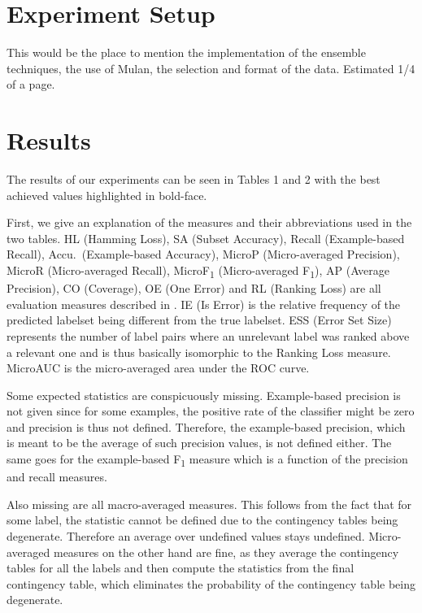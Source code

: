 \section{Experiment Setup}
This would be the place to mention the implementation of the ensemble
techniques, the use of Mulan, the selection and format of the data. Estimated
1/4 of a page.

\section{Results}




The results of our experiments can be seen in Tables 1 and 2 with the
best achieved values highlighted in bold-face.

First, we give an explanation of the measures and their abbreviations
used in the two tables. HL (Hamming Loss), SA (Subset Accuracy),
Recall (Example-based Recall), Accu.\ (Example-based Accuracy), MicroP
(Micro-averaged Precision), MicroR (Micro-averaged Recall),
MicroF\textsubscript{1} (Micro-averaged F\textsubscript{1}), AP
(Average Precision), CO (Coverage), OE (One Error) and RL (Ranking
Loss) are all evaluation measures described in \cite{MLLSlides}. IE
(Is Error) is the relative frequency of the predicted labelset being
different from the true labelset. ESS (Error Set Size) represents the
number of label pairs where an unrelevant label was ranked above a
relevant one and is thus basically isomorphic to the Ranking Loss
measure. MicroAUC is the micro-averaged area under the ROC curve.

Some expected statistics are conspicuously missing. Example-based
precision is not given since for some examples, the positive rate of
the classifier might be zero and precision is thus not
defined. Therefore, the example-based precision, which is meant to be
the average of such precision values, is not defined either. The same
goes for the example-based F\textsubscript{1} measure which is a
function of the precision and recall measures.

Also missing are all macro-averaged measures. This follows from the
fact that for some label, the statistic cannot be defined due to the
contingency tables being degenerate. Therefore an average over
undefined values stays undefined. Micro-averaged measures on the other
hand are fine, as they average the contingency tables for all the
labels and then compute the statistics from the final contingency
table, which eliminates the probability of the contingency table being
degenerate.

